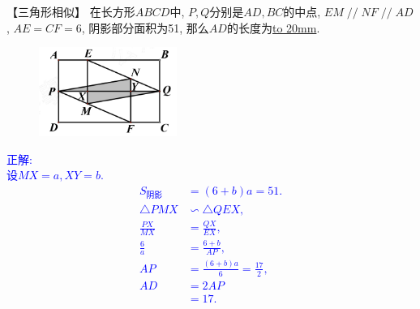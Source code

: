 \item {
    【三角形相似】
    在长方形$ABCD$中, $P,Q$分别是$AD,BC$的中点, $EM\mathop{//}NF\mathop{//}AD$, $AE=CF=6$, 阴影部分面积为51, 那么$AD$的长度为\underline{\hbox to 20mm{}}.
    \begin{figure}[H] 
        \centering
        \includegraphics[width=0.4\textwidth]{./pics/Chapter_2/1.png}
    \end{figure}
    \ifshowSolution 
        \fangsong{}\textcolor{blue}{
            正解: \\
            设$MX=a, XY =b$.\\
            \begin{align*}
                S_{阴影} &= (6+b)a = 51. \\
                \triangle PMX &\backsim \triangle QEX,\\
                \frac{PX}{MX} &= \frac{QX}{EX}, \\
                \frac{6}{a} &= \frac{6+b}{AP}, \\
                AP &= \frac{(6+b)a}{6} = \frac{17}{2}, \\
                AD &= 2AP \\
                &= 17. \\
            \end{align*}
        }
    \else
        \vspace{1cm}
    \fi
}


